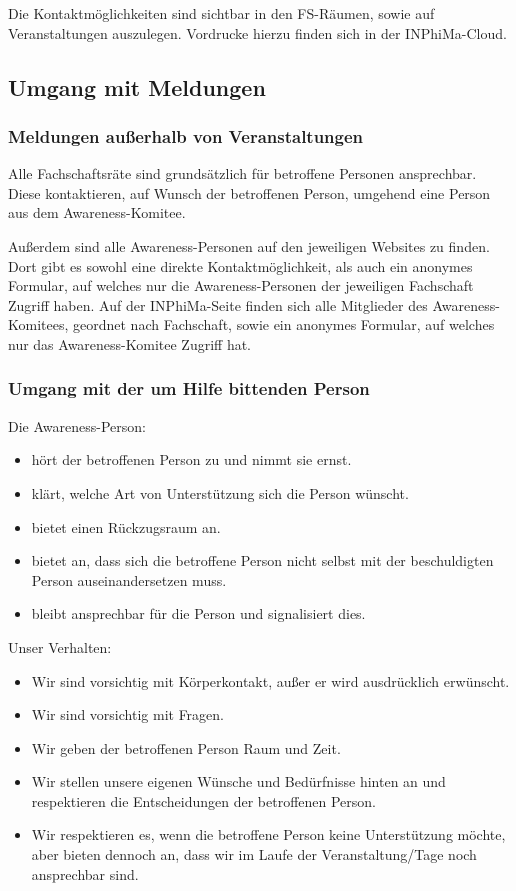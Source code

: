 \documentclass{article}
\begin{document}
Die Kontaktmöglichkeiten sind sichtbar in den FS-Räumen, sowie auf Veranstaltungen auszulegen. Vordrucke hierzu finden sich in der INPhiMa-Cloud. 

\subsection{Umgang mit Meldungen}
\subsubsection{Meldungen außerhalb von Veranstaltungen}
Alle Fachschaftsräte sind grundsätzlich für betroffene Personen ansprechbar. Diese kontaktieren, auf Wunsch der betroffenen Person, umgehend eine Person aus dem Awareness-Komitee. 

Außerdem sind alle Awareness-Personen auf den jeweiligen Websites zu finden. Dort gibt es sowohl eine direkte Kontaktmöglichkeit, als auch ein anonymes Formular, auf welches nur die Awareness-Personen der jeweiligen Fachschaft Zugriff haben. Auf der INPhiMa-Seite finden sich alle Mitglieder des Awareness-Komitees, geordnet nach Fachschaft, sowie ein anonymes Formular, auf welches nur das Awareness-Komitee Zugriff hat.

\subsubsection{Umgang mit der um Hilfe bittenden Person}

Die Awareness-Person:
\begin{itemize}
    \item hört der betroffenen Person zu und nimmt sie ernst.
    \item klärt, welche Art von Unterstützung sich die Person wünscht.
    \item bietet einen Rückzugsraum an.
    \item bietet an, dass sich die betroffene Person nicht selbst mit der beschuldigten Person auseinandersetzen muss.
    \item bleibt ansprechbar für die Person und signalisiert dies.
\end{itemize}
Unser Verhalten:
\begin{itemize}
    \item Wir sind vorsichtig mit Körperkontakt, außer er wird ausdrücklich erwünscht.
    \item Wir sind vorsichtig mit Fragen.
    \item Wir geben der betroffenen Person Raum und Zeit.
    \item Wir stellen unsere eigenen Wünsche und Bedürfnisse hinten an und respektieren die Entscheidungen der betroffenen Person.
    \item Wir respektieren es, wenn die betroffene Person keine Unterstützung möchte, aber bieten dennoch an, dass wir im Laufe der Veranstaltung/Tage noch ansprechbar sind.
\end{itemize}
\end{document}
